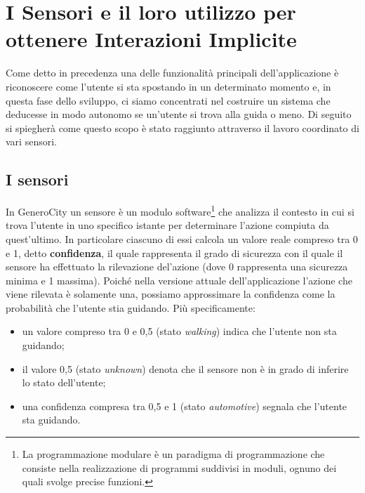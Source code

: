 \chapter{I Sensori e il loro utilizzo per ottenere Interazioni Implicite}

Come detto in precedenza una delle funzionalità principali dell'applicazione è riconoscere come l'utente si sta spostando in un determinato momento e, in questa fase dello sviluppo, ci siamo concentrati nel costruire un sistema che deducesse in modo autonomo se un'utente si trova alla guida o meno. Di seguito si spiegherà come questo scopo è stato raggiunto attraverso il lavoro coordinato di vari sensori.


\section{I sensori}
In GeneroCity un sensore è un modulo software\footnote{La programmazione modulare è un paradigma di programmazione che consiste nella realizzazione di programmi suddivisi in moduli, ognuno dei quali svolge precise funzioni.} che analizza il contesto in cui si trova l'utente in uno specifico istante per determinare l'azione compiuta da quest'ultimo. In particolare ciascuno di essi calcola un valore reale compreso tra 0 e 1, detto \textbf{confidenza}, il quale rappresenta il grado di sicurezza con il quale il sensore ha effettuato la rilevazione del'azione (dove 0 rappresenta una sicurezza minima e 1 massima). Poiché nella versione attuale dell'applicazione l'azione che viene rilevata è solamente una, possiamo approssimare la confidenza come la probabilità che l'utente stia guidando. Più specificamente:
\begin{itemize}
    \item un valore compreso tra 0 e 0,5 (stato \textit{walking}) indica che l'utente non sta guidando;
    \item il valore 0,5 (stato \textit{unknown}) denota che il sensore non è in grado di inferire lo stato dell'utente;
    \item una confidenza compresa tra 0,5 e 1 (stato \textit{automotive}) segnala che l'utente sta guidando.
\end{itemize}

